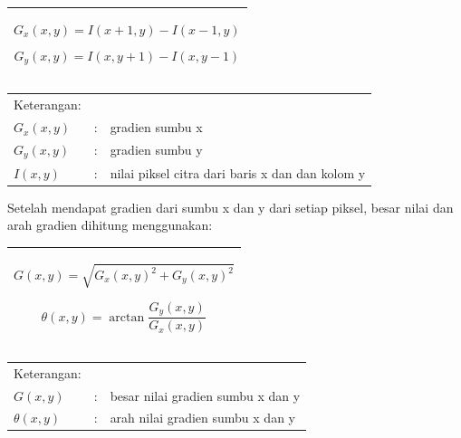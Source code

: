 \begin{table}[H]
	\small
	\begin{adjustbox}{width=1\textwidth}
		\begin{tabular}{|p{13.55cm}|}
			\hline
			\begin{equation} \label{eqn:GradientH}
			\displaystyle
			G_{x}(x,y) = I(x+1,y) - I(x-1,y)
			\end{equation} 
			
			\begin{equation} \label{eqn:GradientV}
			\displaystyle
			G_{y}(x,y) = I(x,y+1) - I(x,y-1)
			\end{equation}\\
			\hline
		\end{tabular}
	\end{adjustbox}
\end{table}

\noindent
\renewcommand{\arraystretch}{1}
\begin{tabularx}{\textwidth}{lll}
	\hline
	Keterangan: \\
	$G_{x}(x,y)$ & : & gradien sumbu x\\
	$G_{y}(x,y)$ & : & gradien sumbu y\\
	$I(x,y)$ & : & nilai piksel citra dari baris x dan dan kolom y\\
	\hline
\end{tabularx}
\vspace{4.5pt}

Setelah mendapat gradien dari sumbu x dan y dari setiap piksel, besar nilai dan arah gradien dihitung menggunakan:
\begin{table}[H]
	\small
	\begin{adjustbox}{width=1\textwidth}
		\begin{tabular}{|p{13.55cm}|}
			\hline
			\begin{equation} \label{eqn:BesarGradien}
			\displaystyle
			G(x,y) = \sqrt{G_{x}(x,y)^{2}+G_{y}(x,y)^{2}}
			\end{equation} 
			
			\begin{equation} \label{eqn:ArahGradien}
			\displaystyle
			\theta(x,y) = \arctan\frac{G_{y}(x,y)}{G_{x}(x,y)}
			\end{equation}\\
			\hline
		\end{tabular}
	\end{adjustbox}
\end{table}

\noindent
\renewcommand{\arraystretch}{1}
\begin{tabularx}{\textwidth}{lll}
	\hline
	Keterangan: \\
	$G(x,y)$ & : & besar nilai gradien sumbu x dan y\\
	$\theta(x,y)$ & : & arah nilai gradien sumbu x dan y\\
	\hline
\end{tabularx}
\vspace{4.5pt}

